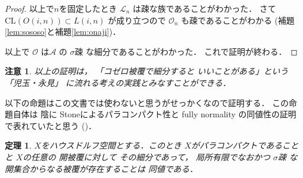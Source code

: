 \documentclass[leqno, a4paper, 12pt]{jsarticle}
\newtheorem{thm}{定理}
\newtheorem*{rmk}{注意}
\newcommand{\cl}{\mathrm{CL}}
\begin{document}
\begin{proof}
以上で$n$を固定したとき
$\mathcal{L}_{n}$
は疎な族であることがわかった．
さて
$\cl(O(i, n))\subset L(i, n)$
が成り立つので
$\mathcal{O}_{n}$
も疎であることがわかる
(補題\ref{lem:sososo}と補題\ref{lem:onaji})．

以上で
$\mathcal{O}$
は$\mathcal{A}$
の
$\sigma$疎
な細分であることがわかった．
これで証明が終わる．
\end{proof}
\begin{rmk}
以上の証明は，
「コゼロ被覆で細分すると
いいことがある」という
「児玉・永見」
に流れる考えの実践とみなすことができる．
\end{rmk}


以下の命題はこの文書では使わないと思うがせっかくなので証明する．
この命題自体は
陰に
Stoneによるパラコンパクト性と
fully normality
の同値性の証明で表れていたと思う
(\cite{MR0026802})．
\begin{thm}
$X$をハウスドルフ空間とする．このとき
$X$がパラコンパクトであることと
$X$の任意の
開被覆に対して
その細分であって，
局所有限でなおかつ
$\sigma$疎
な開集合からなる被覆が存在することは
同値である．
\end{thm}
%
\end{document}

